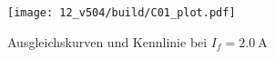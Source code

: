 \begin{figure}
    \centering
    \texttt{[image: 12\_v504/build/C01\_plot.pdf]}
    \caption{Ausgleichskurven und Kennlinie bei $I_f = \qty{2.0}{\ampere}$}
    \label{fig:c01}
\end{figure}
